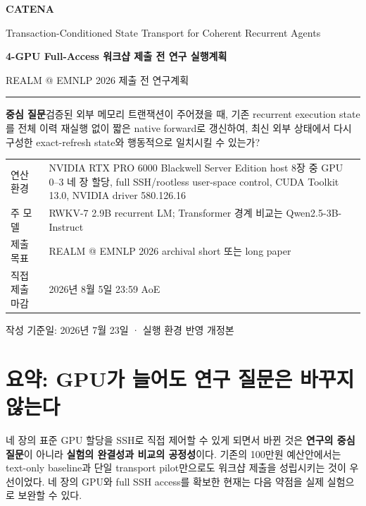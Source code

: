 \documentclass[10.5pt,a4paper]{article}
\newcommand{\HRule}{\rule{\linewidth}{0.5pt}}
\begin{document}
\begin{titlepage}
\vspace*{15mm}
{\Huge\bfseries CATENA}\par
\vspace{2mm}
{\LARGE Transaction-Conditioned State Transport for Coherent Recurrent Agents}\par
\vspace{8mm}
{\Large\bfseries 4-GPU Full-Access 워크샵 제출 전 연구 실행계획}\par
\vspace{4mm}
{\large REALM @ EMNLP 2026 제출 전 연구계획}\par
\vspace{14mm}
\HRule
\vspace{8mm}
\begin{keybox}
\textbf{중심 질문}\quad 검증된 외부 메모리 트랜잭션이 주어졌을 때, 기존 recurrent execution state를 전체 이력 재실행 없이 짧은 native forward로 갱신하여, 최신 외부 상태에서 다시 구성한 exact-refresh state와 행동적으로 일치시킬 수 있는가?
\end{keybox}
\vspace{8mm}
\begin{tabularx}{\textwidth}{@{}L{34mm}Y@{}}
연산 환경 & NVIDIA RTX PRO 6000 Blackwell Server Edition host 8장 중 GPU 0--3 네 장 할당, full SSH/rootless user-space control, CUDA Toolkit 13.0, NVIDIA driver 580.126.16 \\
주 모델 & RWKV-7 2.9B recurrent LM; Transformer 경계 비교는 Qwen2.5-3B-Instruct \\
제출 목표 & REALM @ EMNLP 2026 archival short 또는 long paper \\
직접 제출 마감 & 2026년 8월 5일 23:59 AoE \\
\end{tabularx}
\vfill
{\small 작성 기준일: 2026년 7월 23일 · 실행 환경 반영 개정본}
\end{titlepage}

\tableofcontents
\newpage

\section{요약: GPU가 늘어도 연구 질문은 바꾸지 않는다}

네 장의 표준 GPU 할당을 SSH로 직접 제어할 수 있게 되면서 바뀐 것은 \textbf{연구의 중심 질문}이 아니라 \textbf{실험의 완결성과 비교의 공정성}이다. 기존의 100만원 예산안에서는 text-only baseline과 단일 transport pilot만으로도 워크샵 제출을 성립시키는 것이 우선이었다. 네 장의 GPU와 full SSH access를 확보한 현재는 다음 약점을 실제 실험으로 보완할 수 있다.
\end{document}

